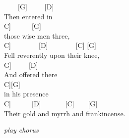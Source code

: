 \documentclass[
  letterpaper,
  a5paper]{memoir}
\begin{document}
~~~~{[}G{]}~~~~~{[}D{]}\\
Then entered in\\
\hspace*{0.333em}\hspace*{0.333em}\hspace*{0.333em}\hspace*{0.333em}\hspace*{0.333em}{[}C{]}~~~~~~{[}G{]}\\
those wise men three,\\
\hspace*{0.333em}\hspace*{0.333em}\hspace*{0.333em}\hspace*{0.333em}{[}C{]}~~~~~~~~{[}D{]}~~~~~~~~{[}C{]}
{[}G{]}\\
Fell reverently upon their knee,\\
\hspace*{0.333em}\hspace*{0.333em}\hspace*{0.333em}{[}G{]}~~~~~{[}D{]}\\
And offered there\\
\hspace*{0.333em}\hspace*{0.333em}\hspace*{0.333em}\hspace*{0.333em}\hspace*{0.333em}\hspace*{0.333em}{[}C{]}{[}G{]}\\
in his presence\\
\hspace*{0.333em}\hspace*{0.333em}\hspace*{0.333em}\hspace*{0.333em}\hspace*{0.333em}{[}C{]}~~~~~~{[}D{]}~~~~~~~{[}C{]}~~~~{[}G{]}\\
Their gold and myrrh and frankincense.

\emph{play chorus}
\end{document}
